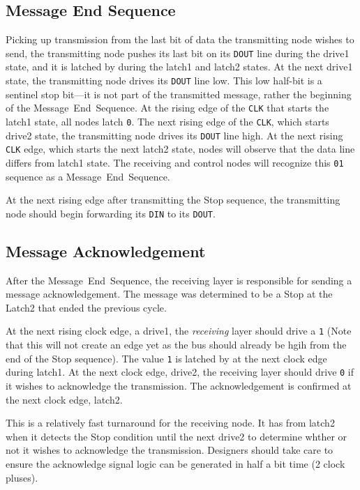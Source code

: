 \subsection{Message End Sequence}
\label{sec:protocol-end}
Picking up transmission from the last bit of data the transmitting node wishes
to send, the transmitting node pushes its last bit on its {\tt DOUT} line
during the {\sc drive1} state, and it is latched by \bus during the {\sc
latch1} and {\sc latch2} states.  At the next {\sc drive1} state, the 
transmitting node drives its {\tt DOUT} line low. This low half-bit is a sentinel 
stop bit---it is not part of the transmitted message, rather the beginning of 
the Message~End~Sequence. At the rising edge of the {\tt CLK} that starts the
{\sc latch1} state, all \bus nodes latch {\tt 0}. The next rising edge of the
{\tt CLK}, which starts {\sc drive2} state, the transmitting node drives its 
{\tt DOUT} line high. At the next rising {\tt CLK} edge, which starts the next 
{\sc latch2} state, nodes will observe that the data line differs from 
{\sc latch1} state. The receiving and control nodes will recognize this
{\tt 01} sequence as a Message~End~Sequence.

At the next rising edge after transmitting the Stop sequence, the transmitting
node should begin forwarding its {\tt DIN} to its {\tt DOUT}.

\subsection{Message Acknowledgement}
\label{sec:protocol-ack}
After the Message~End~Sequence, the receiving layer is responsible for sending a
message acknowledgement. The message was determined to be a Stop at the {\sc
Latch2} that ended the previous cycle.

At the next rising clock edge, a {\sc drive1}, the {\em receiving} layer
should drive a {\tt 1} (Note that this will not create an edge yet as the bus
should already be hgih from the end of the Stop sequence). The value {\tt 1}
is latched by \bus at the next clock edge during {\sc latch1}. At the next
clock edge, {\sc drive2}, the receiving layer should drive {\tt 0} if it
wishes to acknowledge the transmission. The acknowledgement is confirmed at
the next clock edge, {\sc latch2}.

This is a relatively fast turnaround for the receiving node. It has from {\sc
latch2} when it detects the Stop condition until the next {\sc drive2} to
determine whther or not it wishes to acknowledge the transmission. Designers
should take care to ensure the acknowledge signal logic can be generated in
half a bit time (2 clock pluses).


